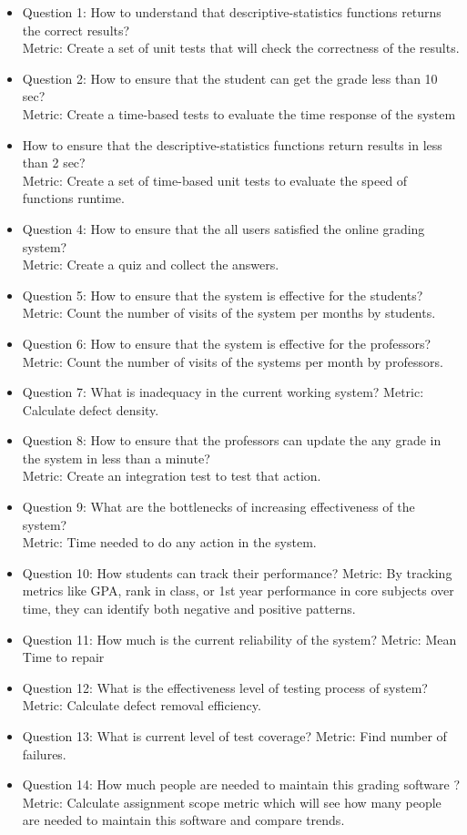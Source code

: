 \documentclass[12pt]{article}
\begin{document}
\begin{itemize}
   \item Question 1: How to understand that descriptive-statistics functions returns the correct results?\\
   Metric: Create a set of unit tests that will check the correctness of the results.
   \item Question 2: How to ensure that the student can get the grade less than 10 sec?\\
   Metric: Create a time-based tests to evaluate the time response of the system
   \item  How to ensure that the descriptive-statistics functions return results in less than 2 sec? \\
   Metric: Create a set of time-based unit tests to evaluate the speed of functions runtime.
   \item Question 4: How to ensure that the all users satisfied the online grading system?\\
   Metric: Create a quiz and collect the answers.
   \item Question 5: How to ensure that the system is effective for the students?\\
   Metric: Count the number of visits of the system per months by students.
   \item Question 6: How to ensure that the system is effective for the professors?\\
   Metric: Count the number of visits of the systems per month by professors.
   \item Question 7: What is inadequacy in the current working system?
   Metric: Calculate defect density.
   \item Question 8: How to ensure that the professors can update the any grade in the system in less than a minute?\\
   Metric: Create an integration test to test that action.
   \item Question 9: What are the bottlenecks of increasing effectiveness of the system?\\
   Metric: Time needed to do any action in the system.
   \item Question 10: How students can track their performance?
   Metric: By tracking metrics like GPA, rank in class, or 1st year performance in core subjects over time, they can identify both negative and positive patterns.
   \item Question 11: How much is the current reliability of the system?
   Metric: Mean Time to repair
   \item Question 12: What is the effectiveness level of testing process of system?
   Metric: Calculate defect removal efficiency.
   \item Question 13: What is current level of test coverage?
   Metric: Find number of failures.
   \item Question 14: How much people are needed to maintain this grading software ?
   Metric: Calculate assignment scope metric which will see how many people are needed to maintain this software and compare trends.


\end{itemize}
\end{document}
